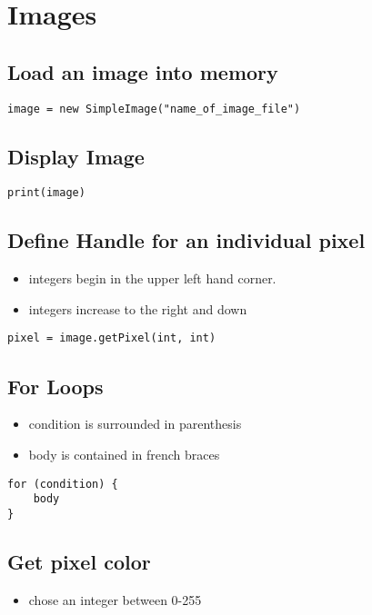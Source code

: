 \documentclass{article}
\begin{document}
\section{Images}

\subsection{Load an image into memory}
\begin{lstlisting}
image = new SimpleImage("name_of_image_file")
\end{lstlisting}

\subsection{Display Image}
\begin{lstlisting}
print(image)
\end{lstlisting}

\subsection{Define Handle for an individual pixel}
    \begin{itemize}
      \item integers begin in the upper left hand corner.
      \item integers increase to the right and down
    \end{itemize}
\begin{lstlisting}
pixel = image.getPixel(int, int)
\end{lstlisting}

\subsection{For Loops}
\begin{itemize}
  \item condition is surrounded in parenthesis
  \item body is contained in french braces
\end{itemize}
\begin{lstlisting}
for (condition) {
    body
}
\end{lstlisting}

\subsection{Get pixel color}
\begin{itemize}
  \item chose an integer between 0-255
\end{itemize}
\end{document}
